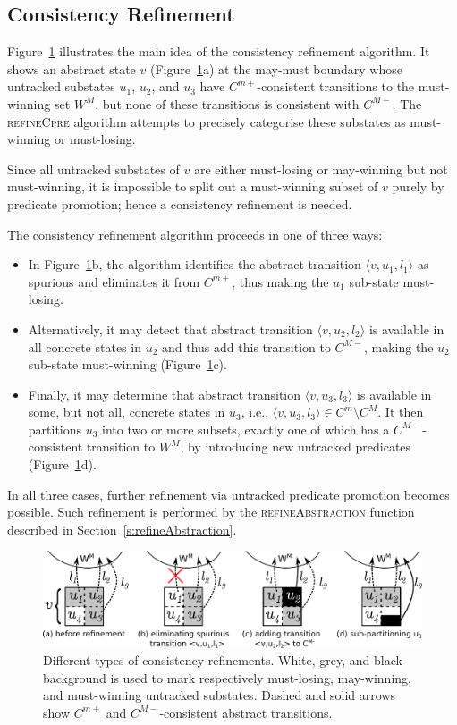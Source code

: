 \subsection{Consistency Refinement}
\label{sec:cons_refinement}

Figure~\ref{f:crefinement} illustrates the main idea of the consistency refinement algorithm.  It shows an abstract state $v$ (Figure~\ref{f:crefinement}a) at the may-must boundary whose untracked substates $u_1$, $u_2$, and $u_3$ have $C^{m+}$-consistent transitions to the must-winning set $W^M$, but none of these transitions is consistent with $C^{M-}$.  The \textsc{refineCpre} algorithm attempts to precisely categorise these substates as must-winning or must-losing.

Since all untracked substates of $v$ are either must-losing or may-winning but not must-winning, it is impossible to split out a must-winning subset of $v$ purely by predicate promotion; hence a consistency refinement is needed.

The consistency refinement algorithm proceeds in one of three ways:
\begin{itemize}
    \item In Figure~\ref{f:crefinement}b, the algorithm identifies the abstract transition $\langle v,u_1, l_1\rangle$ as spurious and eliminates it from $C^{m+}$, thus making the $u_1$ sub-state must-losing.  
    \item Alternatively, it may detect that abstract transition $\langle v, u_2, l_2\rangle$ is available in all concrete states in $u_2$ and thus add this transition to $C^{M-}$, making the $u_2$ sub-state must-winning (Figure~\ref{f:crefinement}c).  
    \item Finally, it may determine that abstract transition $\langle v, u_3, l_3\rangle$ is available in some, but not all, concrete states in $u_3$, i.e., $\langle v, u_3, l_3\rangle\in C^m\setminus C^M$.  It then partitions $u_3$ into two or more subsets, exactly one of which has a $C^{M-}$-consistent transition to $W^M$, by introducing new untracked predicates (Figure~\ref{f:crefinement}d).  
\end{itemize}

In all three cases, further refinement via untracked predicate promotion becomes possible.  Such refinement is performed by the \textsc{refineAbstraction} function described in Section~\ref{s:refineAbstraction}.

\begin{figure}[t]
    \label{f:crefinement}
    \center
    \includegraphics[width=\linewidth]{imgs/crefinement}
    \caption{Different types of consistency refinements.  White, grey, and black background is used to mark respectively must-losing, may-winning, and must-winning untracked substates.  Dashed and solid arrows show $C^{m+}$ and $C^{M-}$-consistent abstract transitions.}
\end{figure}

